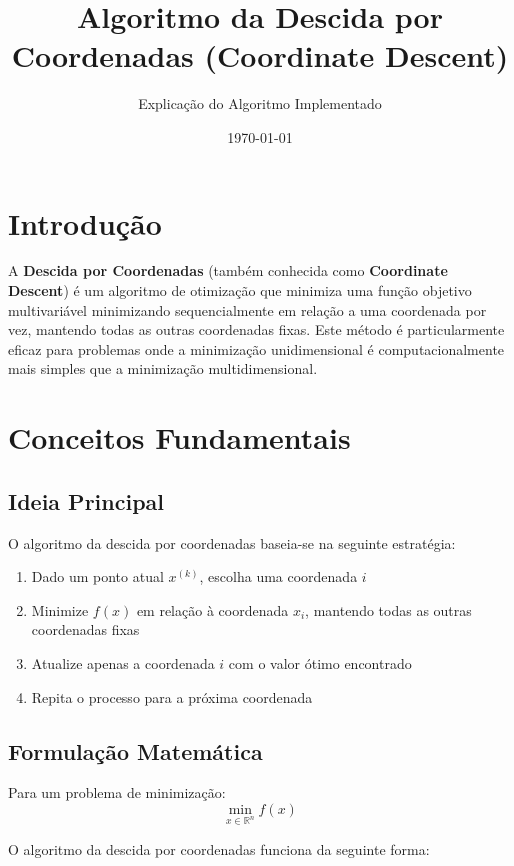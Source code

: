 \documentclass[12pt]{article}
\title{Algoritmo da Descida por Coordenadas (Coordinate Descent)}
\author{Explicação do Algoritmo Implementado}
\date{\today}
\begin{document}
\maketitle

\section{Introdução}

A \textbf{Descida por Coordenadas} (também conhecida como \textbf{Coordinate Descent}) é um algoritmo de otimização que minimiza uma função objetivo multivariável minimizando sequencialmente em relação a uma coordenada por vez, mantendo todas as outras coordenadas fixas. Este método é particularmente eficaz para problemas onde a minimização unidimensional é computacionalmente mais simples que a minimização multidimensional.

\section{Conceitos Fundamentais}

\subsection{Ideia Principal}

O algoritmo da descida por coordenadas baseia-se na seguinte estratégia:

\begin{enumerate}
    \item Dado um ponto atual $x^{(k)}$, escolha uma coordenada $i$
    \item Minimize $f(x)$ em relação à coordenada $x_i$, mantendo todas as outras coordenadas fixas
    \item Atualize apenas a coordenada $i$ com o valor ótimo encontrado
    \item Repita o processo para a próxima coordenada
\end{enumerate}

\subsection{Formulação Matemática}

Para um problema de minimização:
\begin{equation}
\min_{x \in \mathbb{R}^n} f(x)
\end{equation}

O algoritmo da descida por coordenadas funciona da seguinte forma:
\end{document}
